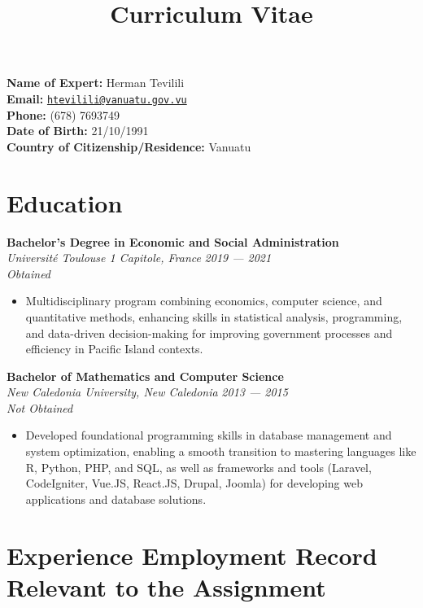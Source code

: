 \documentclass[
  letterpaper,
  DIV=11,
  numbers=noendperiod]{scrartcl}
\title{Curriculum Vitae}
\author{}
\date{}
\providecommand{\tightlist}{%
  \setlength{\itemsep}{0pt}\setlength{\parskip}{0pt}}
\begin{document}
\maketitle


\textbf{Name of Expert:} Herman Tevilili\\
\textbf{Email:}
\href{mailto:htevilili@vanuatu.gov.vu}{\nolinkurl{htevilili@vanuatu.gov.vu}}\\
\textbf{Phone:} (678) 7693749\\
\textbf{Date of Birth:} 21/10/1991\\
\textbf{Country of Citizenship/Residence:} Vanuatu

\section{Education}\label{education}

\textbf{Bachelor's Degree in Economic and Social Administration}\\
\emph{Université Toulouse 1 Capitole, France} {\emph{2019 --- 2021}}\\
\emph{Obtained}

\begin{itemize}
\tightlist
\item
  Multidisciplinary program combining economics, computer science, and
  quantitative methods, enhancing skills in statistical analysis,
  programming, and data-driven decision-making for improving government
  processes and efficiency in Pacific Island contexts.
\end{itemize}

\textbf{Bachelor of Mathematics and Computer Science}\\
\emph{New Caledonia University, New Caledonia} {\emph{2013 --- 2015}}\\
\emph{Not Obtained}\\

\begin{itemize}
\tightlist
\item
  Developed foundational programming skills in database management and
  system optimization, enabling a smooth transition to mastering
  languages like R, Python, PHP, and SQL, as well as frameworks and
  tools (Laravel, CodeIgniter, Vue.JS, React.JS, Drupal, Joomla) for
  developing web applications and database solutions.
\end{itemize}

\section{Experience Employment Record Relevant to the
Assignment}\label{experience-employment-record-relevant-to-the-assignment}
\end{document}
